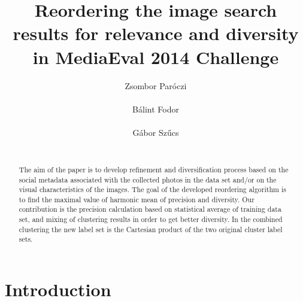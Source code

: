 \documentclass{acm_proc_article-me}
\begin{document}

\title{Reordering the image search results for relevance and diversity in MediaEval 2014 Challenge}


\author{
\alignauthor
Zsombor Par\'oczi\\
       \\
\alignauthor
B\'alint Fodor\\
       \\
\alignauthor
G\'abor Sz\H ucs \\
       \\
}

\maketitle
\begin{abstract}

The aim of the paper is to develop refinement and diversification process
based on the social metadata associated with the collected photos in the
data set and/or on the visual characteristics of the images. The goal of
the developed reordering algorithm is to find the maximal value of
harmonic mean of precision and diversity. Our contribution is the
precision calculation based on statistical average of training data set,
and mixing of clustering results in order to get better diversity. In the
combined clustering the new label set is the Cartesian product of the two
original cluster label sets.

\end{abstract}

\section{Introduction}
\end{document}
